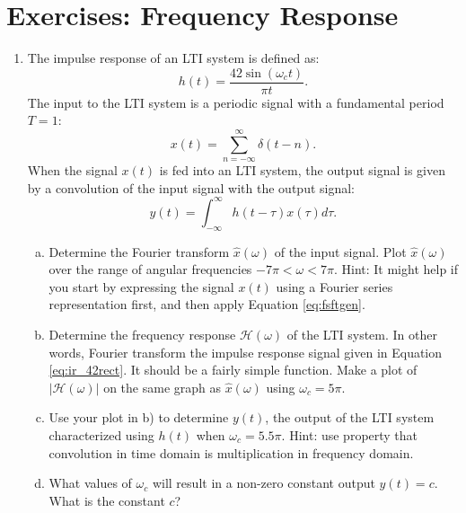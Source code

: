 \newpage
\section{Exercises: Frequency Response}

\begin{enumerate}

  \item The impulse response of an LTI system is defined as:
        \begin{equation}
          h(t) = \frac{42\sin(\omega_c t)}{\pi t}.
          \label{eq:ir_42rect}
        \end{equation}
        The input to the LTI system is a periodic signal with a fundamental period $T=1$:
        \begin{equation}
          x(t) = \sum_{n=-\infty}^{\infty}\delta(t-n).
        \end{equation}
        When the signal $x(t)$ is fed into an LTI system, the output signal is given by a 
        convolution of the input signal with the output signal:
        \begin{equation}
          y(t) = \int_{-\infty}^{\infty} h(t-\tau)x(\tau) d\tau.
        \end{equation}
        \begin{enumerate}[a)]
          \item Determine the Fourier transform $\hat{x}(\omega)$ of the input signal.
                Plot $\hat{x}(\omega)$ over the range of angular frequencies $-7\pi < \omega < 7\pi$.
                Hint: It might help if you start by expressing the signal $x(t)$ using a
                Fourier series representation first, and then apply Equation \ref{eq:fsftgen}.
          \item Determine the frequency response $\mathcal{H}(\omega)$ of the LTI system.
                In other words, Fourier transform the impulse response signal
                given in Equation \ref{eq:ir_42rect}. It should be a fairly
                simple function.
                Make a plot of $|\mathcal{H}(\omega)|$ on the same graph as $\hat{x}(\omega)$ using $\omega_c = 5\pi$.
          \item Use your plot in b) to determine $y(t)$, the output of the LTI system
                characterized using $h(t)$ when $\omega_c=5.5\pi$. 
                Hint: use property that convolution in time domain is multiplication in frequency domain.
          \item What values of $\omega_c$ will result in a non-zero constant 
                output $y(t)=c$. What is the constant $c$?
        \end{enumerate}


\end{enumerate}
